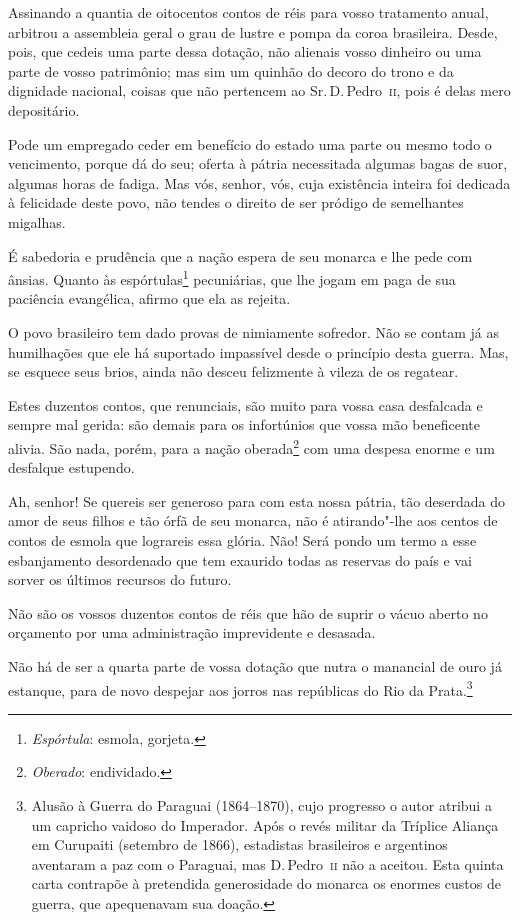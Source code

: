 \begin{linenumbers}
 Assinando a quantia de oitocentos contos de réis para vosso tratamento
anual, arbitrou a assembleia geral o grau de lustre e pompa da coroa
brasileira. Desde, pois, que cedeis uma parte dessa dotação, não
alienais vosso dinheiro ou uma parte de vosso patrimônio; mas sim um
quinhão do decoro do trono e da dignidade nacional, coisas que não
pertencem ao Sr.\,D.\,Pedro~\textsc{ii}, pois é delas mero depositário. 

 Pode um empregado ceder em benefício do estado uma parte ou mesmo todo
o vencimento, porque dá do seu; oferta à pátria necessitada algumas
bagas de suor, algumas horas de fadiga. Mas vós, senhor, vós, cuja
existência inteira foi dedicada à felicidade deste povo, não tendes o
direito de ser pródigo de semelhantes migalhas.

 É sabedoria e prudência que a nação espera de seu monarca e lhe pede
com ânsias. Quanto às espórtulas\footnote{ \textit{Espórtula}: esmola, gorjeta.}
 pecuniárias, que lhe jogam em paga de sua paciência evangélica, afirmo
que ela as rejeita. 

 O povo brasileiro tem dado provas de nimiamente sofredor. Não se contam
já as humilhações que ele há suportado impassível desde o princípio
desta guerra. Mas, se esquece seus brios, ainda não desceu felizmente à
vileza de os regatear. 

 Estes duzentos contos, que renunciais, são muito para vossa casa
desfalcada e sempre mal gerida: são demais para os infortúnios que
vossa mão beneficente alivia. São nada, porém, para a nação
oberada\footnote{ \textit{Oberado}: endividado.}
 com uma despesa enorme e um desfalque estupendo. 

 Ah, senhor! Se quereis ser generoso para com esta nossa pátria, tão
deserdada do amor de seus filhos e tão órfã de seu monarca, não é
atirando"-lhe aos centos de contos de esmola que lograreis essa
glória. Não! Será pondo um termo a esse esbanjamento desordenado que
tem exaurido todas as reservas do país e vai sorver os últimos recursos
do futuro.

 Não são os vossos duzentos contos de réis que hão de suprir o vácuo
aberto no orçamento por uma administração imprevidente e desasada. 

 Não há de ser a quarta parte de vossa dotação que nutra o manancial de
ouro já estanque, para de novo despejar aos jorros nas repúblicas do
Rio da Prata.\footnote{ Alusão à Guerra do Paraguai (1864--1870), cujo progresso o autor
atribui a um capricho vaidoso do Imperador. Após o revés militar da
Tríplice Aliança em Curupaiti (setembro de 1866), estadistas brasileiros e argentinos 
aventaram a paz com o Paraguai, mas D.\,Pedro~\textsc{ii} não a aceitou. Esta
quinta carta contrapõe à pretendida generosidade do monarca os enormes
custos de guerra, que apequenavam sua doação.}
 

\end{linenumbers}
